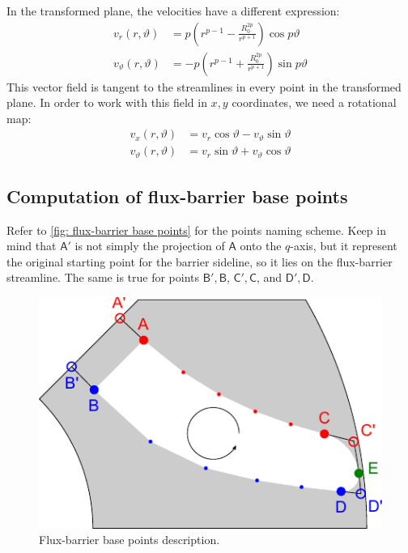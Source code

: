 \documentclass[b5paper,11pt,oneside,fleqn]{article}
\newcommand{\pt}[1]{\mathsf{#1}}
\newcommand{\te}{\vartheta}
\begin{document}
In the transformed plane, the velocities have a different expression:
\begin{equation}
\begin{aligned}
v_r(r,\te)  &=
p \left( r^{p-1} - \frac{R_0^{2p}}{r^{p+1}} \right) \cos p\te \\[1ex]
v_\te(r,\te)  &=
-p \left( r^{p-1} + \frac{R_0^{2p}}{r^{p+1}} \right) \sin p\te
\end{aligned}
\end{equation}
%
This vector field is tangent to the streamlines in every point in the
transformed plane. In order to work with this field in $ x,y $ coordinates, we
need a rotational map:
\begin{equation}
\begin{aligned}
v_x(r,\te) &= v_r \cos\te - v_\te \sin\te \\
v_\te(r,\te) &= v_r \sin\te + v_\te \cos\te
\end{aligned}
\end{equation}



\subsection{Computation of flux-barrier base points}

Refer to \autoref{fig: flux-barrier base points} for the points naming scheme.
Keep in mind that $ \pt{A}' $ is not simply the projection of $ \pt{A} $ onto 
the $ q $-axis, but it represent the original starting point for the barrier 
sideline, so it lies on the flux-barrier streamline. The same is true for 
points
$ \pt{B}',\pt{B} $, 
$ \pt{C}',\pt{C} $, and
$ \pt{D}',\pt{D} $.

\begin{figure}[tb]
\centering
\includegraphics[width=0.75\linewidth]{gfx/BarrierPoints/BarrierPoints}
\caption{Flux-barrier base points description.}
\label{fig: flux-barrier base points}
\end{figure}
\end{document}
